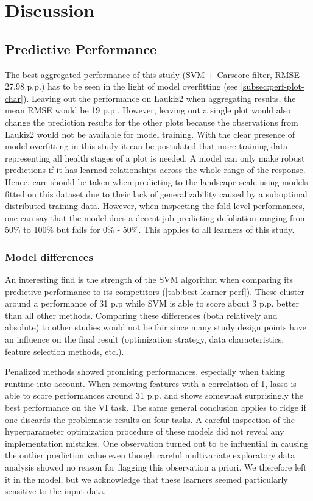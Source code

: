 \documentclass[letterpaper, peerreview, draftcls]{IEEEtran}
\begin{document}
\section{Discussion}

\subsection{Predictive Performance}
The best aggregated performance of this study (SVM + Carscore filter, RMSE 27.98 p.p.) has to be seen in the light of model overfitting (see \autoref{subsec:perf-plot-char}).
Leaving out the performance on Laukiz2 when aggregating results, the mean RMSE would be 19 p.p..
However, leaving out a single plot would also change the prediction results for the other plots because the observations from Laukiz2 would not be available for model training.
With the clear presence of model overfitting in this study it can be postulated that more training data representing all health stages of a plot is needed.
A model can only make robust predictions if it has learned relationships across the whole range of the response.
Hence, care should be taken when predicting to the landscape scale using models fitted on this dataset due to their lack of generalizability caused by a suboptimal distributed training data.
However, when inspecting the fold level performances, one can say that the model does a decent job predicting defoliation ranging from 50\% to 100\% but fails for 0\% - 50\%.
This applies to all learners of this study.

\subsubsection{Model differences}
An interesting find is the strength of the SVM algorithm when comparing its predictive performance to its competitors (\autoref{tab:best-learner-perf}).
These cluster around a performance of 31 p.p while SVM is able to score about 3 p.p. better than all other methods.
Comparing these differences (both relatively and absolute) to other studies would not be fair since many study design points have an influence on the final result (optimization strategy, data characteristics, feature selection methods, etc.).

Penalized methods showed promising performances, especially when taking runtime into account.
When removing features with a correlation of 1, lasso is able to score performances around 31 p.p. and shows somewhat surprisingly the best performance on the VI task.
The same general conclusion applies to ridge if one discards the problematic results on four tasks.
A careful inspection of the hyperparameter optimization procedure of these models did not reveal any implementation mistakes.
One observation turned out to be influential in causing the outlier prediction value even though careful multivariate exploratory data analysis showed no reason for flagging this observation a priori.
We therefore left it in the model, but we acknowledge that these learners seemed particularly sensitive to the input data.
\end{document}
